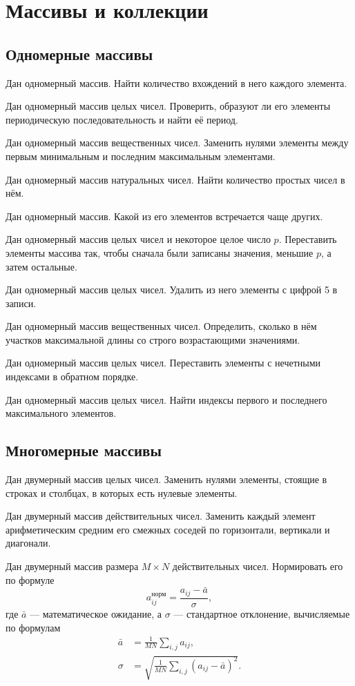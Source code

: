 \section{Массивы и коллекции}


\subsection{Одномерные массивы}

\task Дан одномерный массив. Найти количество вхождений в него каждого
элемента.

\task Дан одномерный массив целых чисел. Проверить, образуют ли его
элементы периодическую последовательность и найти её период.

\task Дан одномерный массив вещественных чисел. Заменить нулями
элементы между первым минимальным и последним максимальным элементами.

\task Дан одномерный массив натуральных чисел. Найти количество
простых чисел в нём.

\task Дан одномерный массив. Какой из его элементов встречается чаще
других.

\task Дан одномерный массив целых чисел и некоторое целое число
$p$. Переставить элементы массива так, чтобы сначала были записаны
значения, меньшие $p$, а затем остальные.

\task Дан одномерный массив целых чисел. Удалить из него элементы с
цифрой 5 в записи.

\task Дан одномерный массив вещественных чисел. Определить, сколько в
нём участков максимальной длины со строго возрастающими значениями.

\task Дан одномерный массив целых чисел. Переставить элементы с
нечетными индексами в обратном порядке.

\task Дан одномерный массив целых чисел. Найти индексы первого и
последнего максимального элементов.

\subsection{Многомерные массивы}

\task Дан двумерный массив целых чисел. Заменить нулями элементы,
стоящие в строках и столбцах, в которых есть нулевые элементы.

\task Дан двумерный массив действительных чисел. Заменить каждый элемент
арифметическим средним его смежных соседей по горизонтали, вертикали и
диагонали.

\task Дан двумерный массив размера $M\times N$ действительных
чисел. Нормировать его по формуле
\[
a_{ij}^\textrm{норм} = \frac{a_{ij}-\bar{a}}{\sigma},
\]
где $\bar{a}$ — математическое ожидание, а $\sigma$ — стандартное
отклонение, вычисляемые по формулам
\begin{align*}
  \bar{a} &= \frac{1}{MN}\sum_{i,j}a_{ij},\\
  \sigma  &= \sqrt{\frac{1}{MN}\sum_{i,j}(a_{ij}-\bar{a})^2}. 
\end{align*}

